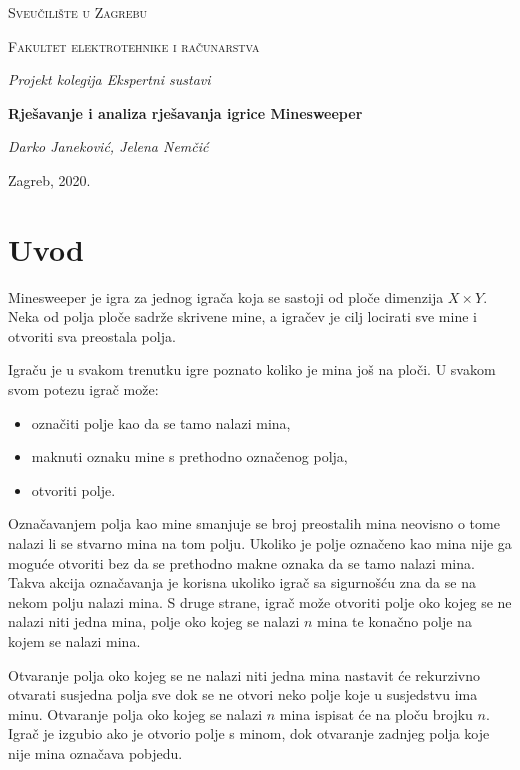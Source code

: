 \documentclass{article}
\numberwithin{figure}{section}
\numberwithin{table}{section}
\begin{document}
\begin{titlepage}
	\centering
	{\scshape\LARGE Sveučilište u Zagrebu\par}
	\vspace{0.5cm}
	{\scshape\Large Fakultet elektrotehnike i računarstva\par}
    \vfill
	{\Large\itshape Projekt kolegija Ekspertni sustavi \par}
	\vspace{0.5cm}
	{\huge\bfseries Rješavanje i analiza rješavanja igrice Minesweeper\par}
	\vspace{0.5cm}
	{\Large\itshape Darko Janeković, Jelena Nemčić \par}
	\vfill
	{\large Zagreb, 2020.}
\end{titlepage}

\section{Uvod}

Minesweeper je igra za jednog igrača koja se sastoji od ploče dimenzija $X \times Y$. Neka od polja ploče sadrže skrivene mine, a igračev je cilj locirati sve mine i otvoriti sva preostala polja.

Igraču je u svakom trenutku igre poznato koliko je mina još na ploči. U svakom svom potezu igrač može:
\begin{itemize}
    \item označiti polje kao da se tamo nalazi mina,
    \item maknuti oznaku mine s prethodno označenog polja,
    \item otvoriti polje.
\end{itemize}

Označavanjem polja kao mine smanjuje se broj preostalih mina neovisno o tome nalazi li se stvarno mina na tom polju. Ukoliko je polje označeno kao mina nije ga moguće otvoriti bez da se prethodno makne oznaka da se tamo
nalazi mina. Takva akcija označavanja je korisna ukoliko igrač sa sigurnošću zna da se na nekom polju
nalazi mina. S druge strane, igrač može otvoriti polje oko kojeg se ne nalazi niti jedna
mina, polje oko kojeg se nalazi $n$ mina te konačno polje na kojem se nalazi mina.

Otvaranje polja oko kojeg se ne nalazi niti jedna mina nastavit će rekurzivno otvarati susjedna
polja sve dok se ne otvori neko polje koje u susjedstvu ima minu. Otvaranje polja oko kojeg
se nalazi $n$ mina ispisat će na ploču brojku $n$. Igrač je izgubio ako je otvorio polje s minom, dok otvaranje zadnjeg polja koje nije mina
označava pobjedu.
\end{document}
